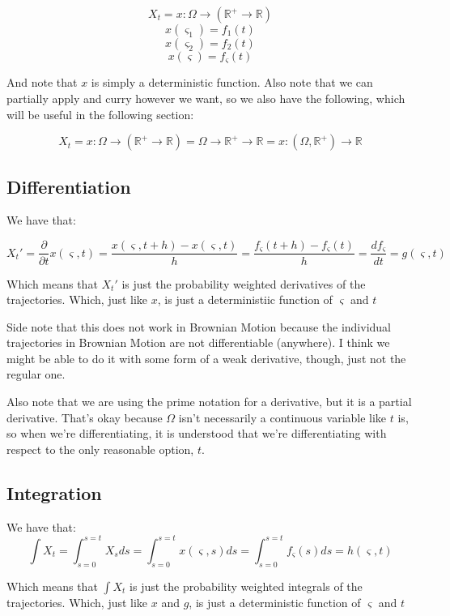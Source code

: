 \documentclass{article}
\begin{document}
$$X_t = x : \Omega \rightarrow \left(\mathbb{R}^+ \rightarrow  \mathbb{R} \right)$$ 
$$x(\varsigma_1) = f_1(t)$$
$$x(\varsigma_2) = f_2(t)$$
$$x(\varsigma) = f_\varsigma(t)$$

And note that $x$ is simply a deterministic function.  Also note that we can partially apply and curry however we want, so we also have the following, which will be useful in the following section:

$$X_t = x : \Omega \rightarrow \left(\mathbb{R}^+ \rightarrow  \mathbb{R} \right) = \Omega \rightarrow \mathbb{R}^+ \rightarrow  \mathbb{R} = x :  \left(\Omega  , \mathbb{R}^+\right)\rightarrow  \mathbb{R}$$ 

\subsection{Differentiation}
We have that:

$$X_t' = \frac{\partial}{\partial t}x(\varsigma,t)= \frac{x\left(\varsigma, t + h\right) - x\left(\varsigma, t\right)}{h} = \frac{f_\varsigma\left(t + h\right) - f_\varsigma\left(t\right)}{h} = \frac{df_\varsigma}{dt} =g\left(\varsigma, t\right)$$

Which means that $X_t'$ is just the probability weighted derivatives of the trajectories. Which, just like $x$, is just a deterministiic function of $\varsigma$ and $t$

Side note that this does not work in Brownian Motion because the individual trajectories in Brownian Motion are not differentiable (anywhere).  I think we might be able to do it with some form of a weak derivative, though, just not the regular one.

Also note that we are using the prime notation for a derivative, but it is a partial derivative. That's okay because $\Omega$ isn't necessarily a continuous variable like $t$ is, so when we're differentiating, it is understood that we're differentiating with respect to the only reasonable option, $t$.

\subsection{Integration}
We have that:
$$\int X_t= \int_{s = 0}^{s = t} X_s ds = \int_{s = 0}^{s = t} x\left(\varsigma,s\right) ds = \int_{s = 0}^{s = t} f_\varsigma\left(s\right) ds  = h\left(\varsigma,t\right)$$

Which means that $\int X_t$ is just the probability weighted integrals of the trajectories.  Which, just like $x$ and $g$, is just a deterministic function of $\varsigma$ and $t$
\end{document}
